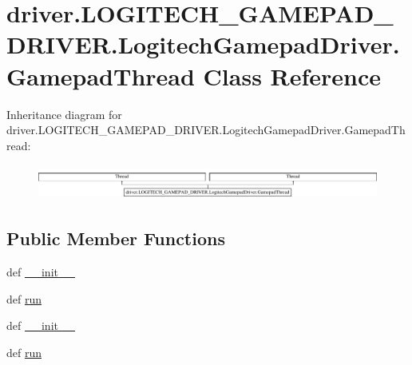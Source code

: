\hypertarget{classdriver_1_1LOGITECH__GAMEPAD__DRIVER_1_1LogitechGamepadDriver_1_1GamepadThread}{}\section{driver.\+L\+O\+G\+I\+T\+E\+C\+H\+\_\+\+G\+A\+M\+E\+P\+A\+D\+\_\+\+D\+R\+I\+V\+E\+R.\+Logitech\+Gamepad\+Driver.\+Gamepad\+Thread Class Reference}
\label{classdriver_1_1LOGITECH__GAMEPAD__DRIVER_1_1LogitechGamepadDriver_1_1GamepadThread}
Inheritance diagram for driver.\+L\+O\+G\+I\+T\+E\+C\+H\+\_\+\+G\+A\+M\+E\+P\+A\+D\+\_\+\+D\+R\+I\+V\+E\+R.\+Logitech\+Gamepad\+Driver.\+Gamepad\+Thread\+:\begin{figure}[H]
\begin{center}
\leavevmode
\includegraphics[height=1.166667cm]{classdriver_1_1LOGITECH__GAMEPAD__DRIVER_1_1LogitechGamepadDriver_1_1GamepadThread}
\end{center}
\end{figure}
\subsection*{Public Member Functions}
\begin{DoxyCompactItemize}
\item 
def \hyperlink{classdriver_1_1LOGITECH__GAMEPAD__DRIVER_1_1LogitechGamepadDriver_1_1GamepadThread_aa08ed3fd5770b7518dd3c3672adb37d3}{\+\_\+\+\_\+init\+\_\+\+\_\+}
\item 
def \hyperlink{classdriver_1_1LOGITECH__GAMEPAD__DRIVER_1_1LogitechGamepadDriver_1_1GamepadThread_a1081a12fcf001359ba0755676ef9db77}{run}
\item 
def \hyperlink{classdriver_1_1LOGITECH__GAMEPAD__DRIVER_1_1LogitechGamepadDriver_1_1GamepadThread_aa08ed3fd5770b7518dd3c3672adb37d3}{\+\_\+\+\_\+init\+\_\+\+\_\+}
\item 
def \hyperlink{classdriver_1_1LOGITECH__GAMEPAD__DRIVER_1_1LogitechGamepadDriver_1_1GamepadThread_a1081a12fcf001359ba0755676ef9db77}{run}
\end{DoxyCompactItemize}
